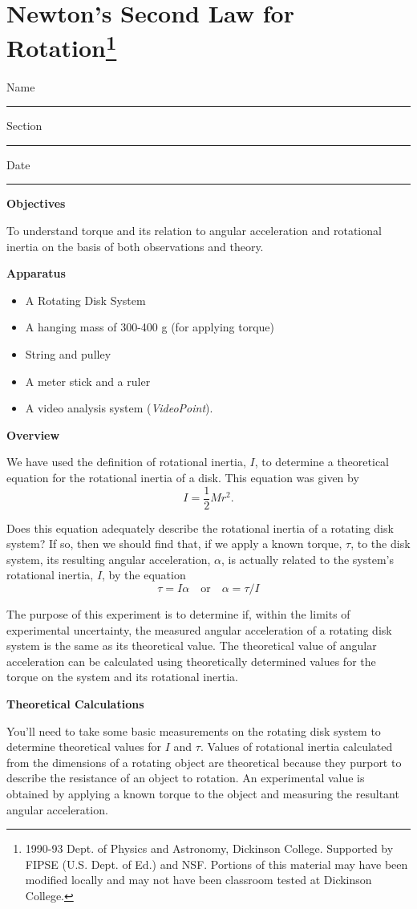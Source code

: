 
\section{Newton's Second Law for Rotation\footnote{
1990-93 Dept. of Physics and Astronomy, Dickinson College. Supported by FIPSE
(U.S. Dept. of Ed.) and NSF. Portions of this material may have been modified
locally and may not have been classroom tested at Dickinson College.
}}

Name \rule{2.0in}{0.1pt}\hfill{}Section \rule{1.0in}{0.1pt}\hfill{}Date \rule{1.0in}{0.1pt}

\textbf{Objectives} 

To understand torque and its relation to angular acceleration and rotational
inertia on the basis of both observations and theory. 

\textbf{Apparatus}

\begin{itemize}
\item A Rotating Disk System 
\item A hanging mass of 300-400 g (for applying torque) 
\item String and pulley
\item A meter stick and a ruler 
\item A video analysis system (\textit{VideoPoint}).
\end{itemize}
\textbf{Overview} 

We have used the definition of rotational inertia, $I$, to determine a theoretical
equation for the rotational inertia of a disk. This equation was given by
\[
I=\frac{1}{2}Mr^{2}.\]


Does this equation adequately describe the rotational inertia of a rotating
disk system? If so, then we should find that, if we apply a known torque, \( \tau  \),
to the disk system, its resulting angular acceleration, \( \alpha  \), is actually
related to the system's rotational inertia, $I$, by the equation
\[
\tau =I\alpha \quad \mbox{or}\quad \alpha =\tau /I\]


The purpose of this experiment is to determine if, within the limits of experimental
uncertainty, the measured angular acceleration of a rotating disk system is
the same as its theoretical value. The theoretical value of angular acceleration
can be calculated using theoretically determined values for the torque on the
system and its rotational inertia.

\textbf{Theoretical Calculations} 

You'll need to take some basic measurements on the rotating disk system
to determine theoretical values for $I$ and \( \tau  \). Values of rotational
inertia calculated from the dimensions of a rotating object are theoretical
because they purport to describe the resistance of an object to rotation. An
experimental value is obtained by applying a known torque to the object and
measuring the resultant angular acceleration.

